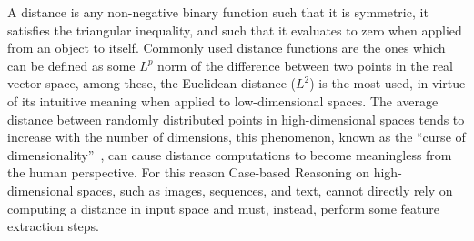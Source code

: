 A distance is any non-negative binary function such that it is symmetric, it satisfies the triangular inequality, and such that it evaluates to zero when applied from an object to itself.
Commonly used distance functions are the ones which can be defined as some $L^p$ norm of the difference between two points in the real vector space, among these, the Euclidean distance ($L^2$) is the most used, in virtue of its intuitive meaning when applied to low-dimensional spaces.
%
The average distance between randomly distributed points in high-dimensional spaces tends to increase with the number of dimensions, this phenomenon, known as the ``curse of dimensionality''~\cite{koppen2000curse}, can cause distance computations to become meaningless from the human perspective. For this reason Case-based Reasoning on high-dimensional spaces, such as images, sequences, and text, cannot directly rely on computing a distance in input space and must, instead, perform some feature extraction steps.
%
%
%
%

